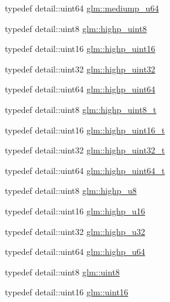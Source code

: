 \begin{DoxyCompactItemize}
\item 
typedef detail\+::uint64 \hyperlink{group__gtc__type__precision_ga00c51a16fa190b0a90205d50d6d8a44a}{glm\+::mediump\+\_\+u64}
\item 
typedef detail\+::uint8 \hyperlink{group__gtc__type__precision_ga2c27c6dd26e893786f04b10f99c1ee95}{glm\+::highp\+\_\+uint8}
\item 
typedef detail\+::uint16 \hyperlink{group__gtc__type__precision_ga4d32967d45ba8365e2a05eaaac85e978}{glm\+::highp\+\_\+uint16}
\item 
typedef detail\+::uint32 \hyperlink{group__gtc__type__precision_ga3145e44c73e2df7dfe4f3cb65974bf22}{glm\+::highp\+\_\+uint32}
\item 
typedef detail\+::uint64 \hyperlink{group__gtc__type__precision_ga8079c653e20cda03d34b99de629a7b09}{glm\+::highp\+\_\+uint64}
\item 
typedef detail\+::uint8 \hyperlink{group__gtc__type__precision_ga9ba529fcc75b82d23da979f0ce6e4518}{glm\+::highp\+\_\+uint8\+\_\+t}
\item 
typedef detail\+::uint16 \hyperlink{group__gtc__type__precision_ga3145bc0ee80432c165e985a188a722b3}{glm\+::highp\+\_\+uint16\+\_\+t}
\item 
typedef detail\+::uint32 \hyperlink{group__gtc__type__precision_ga8eb85ad460079c63b68866ae34637bda}{glm\+::highp\+\_\+uint32\+\_\+t}
\item 
typedef detail\+::uint64 \hyperlink{group__gtc__type__precision_ga6e66f40c5909bfc872b068187fa6029e}{glm\+::highp\+\_\+uint64\+\_\+t}
\item 
typedef detail\+::uint8 \hyperlink{group__gtc__type__precision_ga8a60abe782749c504fb5ae51eb8b49cc}{glm\+::highp\+\_\+u8}
\item 
typedef detail\+::uint16 \hyperlink{group__gtc__type__precision_ga9da2178d7501d9c0f225fa1a7b70cb45}{glm\+::highp\+\_\+u16}
\item 
typedef detail\+::uint32 \hyperlink{group__gtc__type__precision_gae8e8a2c712653891a03c171795286ac5}{glm\+::highp\+\_\+u32}
\item 
typedef detail\+::uint64 \hyperlink{group__gtc__type__precision_ga6006ea883d3c0491791650b2fb84de39}{glm\+::highp\+\_\+u64}
\item 
typedef detail\+::uint8 \hyperlink{group__gtc__type__precision_ga1a7dcd8aac97cc8020817c94049deff2}{glm\+::uint8}
\item 
typedef detail\+::uint16 \hyperlink{group__gtc__type__precision_gad8c2939e1fdd8e5828b31d95c52255d5}{glm\+::uint16}
\item 

\end{DoxyCompactItemize}

